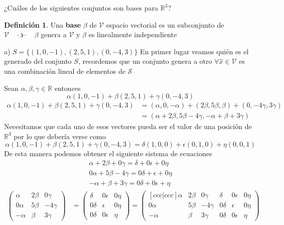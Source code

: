 \documentclass[letterpaper]{article}
\newcommand{\tq}{ \quad \cdot  \backepsilon \cdot \quad }
\newcommand{\R}{\mathds{R}}
\renewcommand{\*}{\cdot}
\theoremstyle{definition}
\newtheorem{definition}{Definición}
\begin{document}
\begin{ejercicio}{8}
	¿Cuáles de los siguientes conjuntos son bases para $\mathbb{R}^{3}$?
\end{ejercicio}
	\begin{definition}
		Una \textbf{base} $ \beta $ de $ \mathcal{V} $ espacio vectorial es un subconjunto de $ \mathcal{V} \tq \beta$  genera a $ \mathcal{V} $ y $ \beta $ es linealmente independiente
	\end{definition}

	a)  $S = \lbrace (1,0,-1),(2,5,1),(0,-4,3) \rbrace$
	En primer lugar veamos quién es el generado del conjunto $ S $, recordemos que un conjunto genera a otro $ \forall \hat{x} \in \mathcal{V} $ es una combinación lineal de elementos de $ \mathcal{S} $ 
	
	Sean $ \alpha, \beta, \gamma \in \R $ entonces
	\[ \alpha(1,0,-1) + \beta(2,5,1) + \gamma(0,-4,3)  \]
	\begin{align*}
		\alpha(1,0,-1)+ \beta(2,5,1)+ \gamma(0,-4,3) & = (\alpha,0,-\alpha) + (2\beta,5\beta,\beta) + (0,-4\gamma,3\gamma)\\
		& = (\alpha + 2\beta ,5\beta -4\gamma,-\alpha + \beta +3\gamma)
	\end{align*}
	Necesitamos que cada uno de esos vectores pueda ser el valor de una posición de $ \R^3 $ por lo que debería verse como \[ 	\alpha(1,0,-1)+ \beta(2,5,1)+ \gamma(0,-4,3) = \delta(1,0,0) + \epsilon(0,1,0) + \eta(0,0,1) \] De esta manera podemos obtener el siguiente sistema de ecuaciones
	\begin{align*}
		\alpha + 2\beta + 0\gamma = \delta + 0\epsilon + 0\eta\\
		0\alpha + 5\beta -4\gamma = 0\delta + \epsilon + 0\eta\\
		-\alpha + \beta +3\gamma = 0\delta +0\epsilon + \eta
	\end{align*}
	\begin{align*}
		\begin{pmatrix}
			\alpha & 2\beta & 0\gamma\\
			0\alpha & 5\beta & -4\gamma\\
			-\alpha & \beta & 3\gamma
		\end{pmatrix}
		&= 		\begin{pmatrix}
		\delta & 0\epsilon & 0\eta\\
		0\delta & \epsilon & 0\eta\\
		0\delta & 0\epsilon & \eta
		\end{pmatrix}  = 		 \begin{pmatrix}[ccc|ccc]
		\alpha & 2\beta & 0\gamma & \delta & 0\epsilon & 0\eta\\
		0\alpha & 5\beta & -4\gamma& 0\delta & \epsilon & 0\eta\\
		-\alpha & \beta & 3\gamma & 0\delta & 0\epsilon & \eta
		\end{pmatrix} 
	\end{align*}
\end{document}
